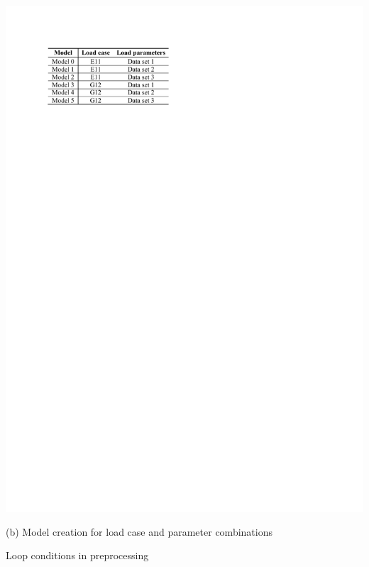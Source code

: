 \begin{table}[H]
\begin{minipage}[T!]{1.0\textwidth}
\begin{minipage}[T!][5.3cm][T!]{0.43\textwidth}
                \includegraphics[width=1.0\textwidth]{ModelCombinations.pdf}
                \vfill{}
                \caption*{(b) Model creation for load case and parameter combinations}
                \label{tab:modelCombinations}
            \end{minipage}
        \end{minipage}    
        \caption{Loop conditions in preprocessing}
        \label{tab:ModelSettings}
	\end{table}
    
